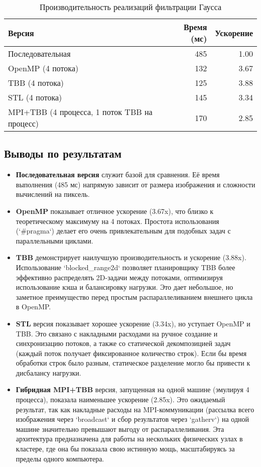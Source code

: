 \documentclass[12pt,a4paper]{extarticle}
\begin{document}
\begin{table}[H]
\centering
\caption{Производительность реализаций фильтрации Гаусса}
\begin{tabular}{lrr}
\toprule
\textbf{Версия} & \textbf{Время (мс)} & \textbf{Ускорение} \\
\midrule
Последовательная & 485 & 1.00 \\
OpenMP (4 потока) & 132 & 3.67 \\
TBB (4 потока) & 125 & 3.88 \\
STL (4 потока) & 145 & 3.34 \\
MPI+TBB (4 процесса, 1 поток TBB на процесс) & 170 & 2.85 \\
\bottomrule
\end{tabular}
\label{tab:performance}
\end{table}

\subsection{Выводы по результатам}
\begin{itemize}
\item \textbf{Последовательная версия} служит базой для сравнения. Её время выполнения (485 мс) напрямую зависит от размера изображения и сложности вычислений на пиксель.
\item \textbf{OpenMP} показывает отличное ускорение (3.67x), что близко к теоретическому максимуму на 4 потоках. Простота использования (`#pragma`) делает его очень привлекательным для подобных задач с параллельными циклами.
\item \textbf{TBB} демонстрирует наилучшую производительность и ускорение (3.88x). Использование `blocked_range2d` позволяет планировщику TBB более эффективно распределять 2D-задачи между потоками, оптимизируя использование кэша и балансировку нагрузки. Это дает небольшое, но заметное преимущество перед простым распараллеливанием внешнего цикла в OpenMP.
\item \textbf{STL} версия показывает хорошее ускорение (3.34x), но уступает OpenMP и TBB. Это связано с накладными расходами на ручное создание и синхронизацию потоков, а также со статической декомпозицией задач (каждый поток получает фиксированное количество строк). Если бы время обработки строк было разным, статическое разделение могло бы привести к дисбалансу нагрузки.
\item \textbf{Гибридная MPI+TBB} версия, запущенная на одной машине (эмулируя 4 процесса), показала наименьшее ускорение (2.85x). Это ожидаемый результат, так как накладные расходы на MPI-коммуникации (рассылка всего изображения через `broadcast` и сбор результатов через `gatherv`) на одной машине значительно превышают выгоду от распараллеливания. Эта архитектура предназначена для работы на нескольких физических узлах в кластере, где она бы показала свою истинную мощь, масштабируясь за пределы одного компьютера.
\end{itemize}
\end{document}

